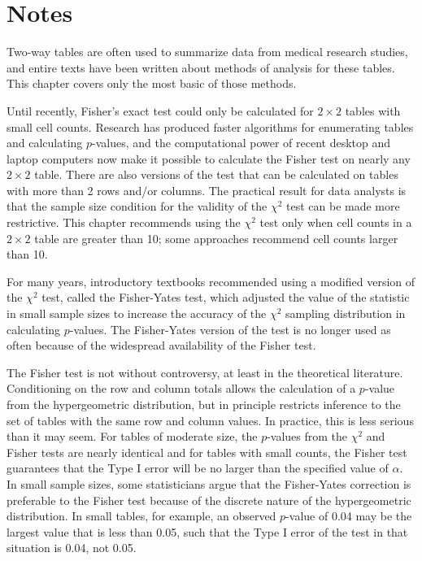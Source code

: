 

\section{Notes}
\label{infForPropNotes}

Two-way tables are often used to summarize data from medical research studies, and entire texts have been written about methods of analysis for these tables.  This chapter covers only the most basic of those methods. 

Until recently, Fisher's exact test could only be calculated for $2 \times 2$ tables with small cell counts. Research has produced faster algorithms for enumerating tables and calculating $p$-values, and the computational power of recent desktop and laptop computers now make it possible to calculate the Fisher test on nearly any $2 \times 2$ table.  There are also versions of the test that can be calculated on tables with more than 2 rows and/or columns.  The practical result for data analysts is that the sample size condition for the validity of the $\chi^2$ test can be made more restrictive.  This chapter recommends using the $\chi^2$ test only when cell counts in a $2 \times 2$ table are greater than 10; some approaches recommend cell counts larger than 10.

For many years, introductory textbooks recommended using a modified version of the $\chi^2$ test, called the Fisher-Yates test, which adjusted the value of the statistic in small sample sizes to increase the accuracy of the $\chi^2$ sampling distribution in calculating $p$-values.  The Fisher-Yates version of the test is no longer used as often because of the widespread availability of the Fisher test.

The Fisher test is not without controversy, at least in the theoretical literature.  Conditioning on the row and column totals allows the calculation of a $p$-value from the hypergeometric distribution, but in principle restricts inference to the set of tables with the same row and column values.  In practice, this is less serious than it may seem. For tables of moderate size, the $p$-values from the $\chi^2$ and Fisher tests are nearly identical and for tables with small counts, the Fisher test guarantees that the Type I error will be no larger than the specified value of $\alpha$.   In small sample sizes, some statisticians argue that the Fisher-Yates correction is preferable to the Fisher test because of the discrete nature of the hypergeometric distribution.  In small tables, for example, an observed $p$-value of 0.04 may be the largest value that is less than 0.05, such that the Type I error of the test in that situation is 0.04, not 0.05.

